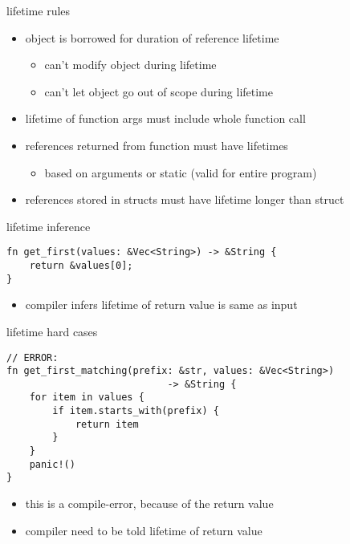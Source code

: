 \begin{frame}{lifetime rules}
    \begin{itemize}
    \item object is borrowed for duration of reference lifetime
        \begin{itemize}
        \item can't modify object during lifetime
        \item can't let object go out of scope during lifetime
        \end{itemize}
    \item lifetime of function args must include whole function call
    \item references returned from function must have lifetimes
        \begin{itemize}
        \item based on arguments or static (valid for entire program)
        \end{itemize}
    \item references stored in structs must have lifetime longer than struct
    \end{itemize}
\end{frame}

\begin{frame}[fragile,label=lifetimeHard]{lifetime inference}
\begin{verbatim}
fn get_first(values: &Vec<String>) -> &String {
    return &values[0];
}
\end{verbatim}
\begin{itemize}
    \item compiler infers lifetime of return value is same as input
\end{itemize}
\end{frame}

\begin{frame}[fragile,label=lifetimeHard2]{lifetime hard cases}
\begin{verbatim}
// ERROR:
fn get_first_matching(prefix: &str, values: &Vec<String>)
                            -> &String {
    for item in values {
        if item.starts_with(prefix) {
            return item
        }
    }
    panic!()
}
\end{verbatim}
\begin{itemize}
    \item this is a compile-error, because of the return value
    \item compiler need to be told lifetime of return value
\end{itemize}
\end{frame}


